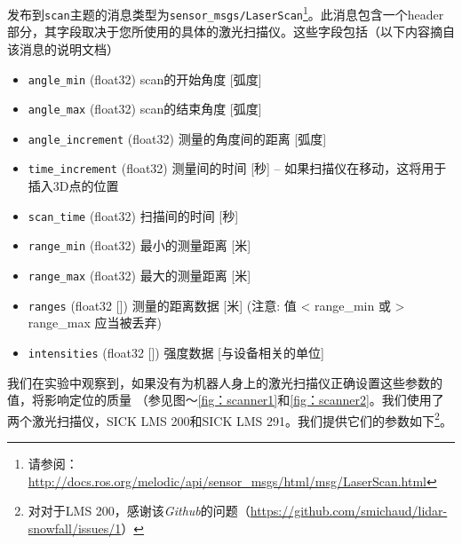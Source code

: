 发布到\texttt{scan}主题的消息类型为\texttt{sensor\_msgs/LaserScan}\footnote{请参阅：\url{http://docs.ros.org/melodic/api/sensor_msgs/html/msg/LaserScan.html}}。此消息包含一个header部分，其字段取决于您所使用的具体的激光扫描仪。这些字段包括（以下内容摘自该消息的说明文档）

\begin{itemize}
	\item \texttt{angle\_min} (float32) scan的开始角度 [弧度] %
	\item \texttt{angle\_max} (float32) scan的结束角度 [弧度] %
	\item \texttt{angle\_increment} (float32) 测量的角度间的距离 [弧度] %
	\item \texttt{time\_increment} (float32) 测量间的时间 [秒] -- 如果扫描仪在移动，这将用于插入3D点的位置 %
	\item \texttt{scan\_time} (float32) 扫描间的时间 [秒] %
	\item \texttt{range\_min} (float32) 最小的测量距离 [米]%
	\item \texttt{range\_max} (float32) 最大的测量距离 [米] %
	
	\item \texttt{ranges} (float32 [])  测量的距离数据 [米] (注意: 值 < range\_min 或 > range\_max 应当被丢弃)
	\item \texttt{intensities} (float32 []) 强度数据 [与设备相关的单位]
\end{itemize}


我们在实验中观察到，如果没有为机器人身上的激光扫描仪正确设置这些参数的值，将影响定位的质量
（参见图〜\ref{fig：scanner1}和\ref{fig：scanner2}。我们使用了两个激光扫描仪，SICK LMS 200和SICK LMS 291。我们提供它们的参数如下\footnote{对对于LMS 200，感谢该\emph{Github}的问题（\url{https://github.com/smichaud/lidar-snowfall/issues/1}）}。

